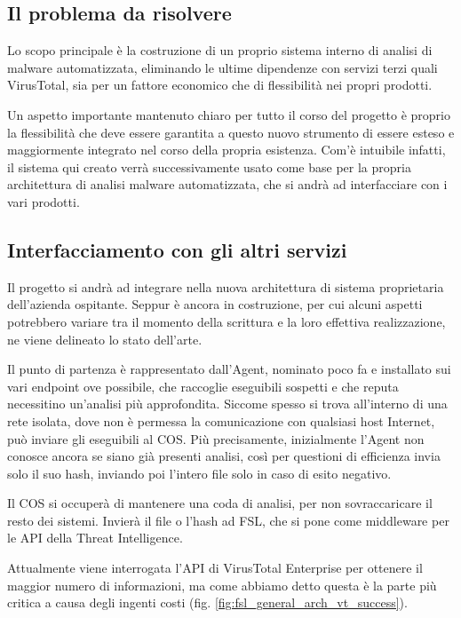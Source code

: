\subsection{Il problema da risolvere}
Lo scopo principale è la costruzione di un proprio sistema interno di analisi di malware automatizzata, eliminando le ultime dipendenze con servizi terzi quali VirusTotal, sia per un fattore economico che di flessibilità nei propri prodotti.

Un aspetto importante mantenuto chiaro per tutto il corso del progetto è proprio la flessibilità che deve essere garantita a questo nuovo strumento di essere esteso e maggiormente integrato nel corso della propria esistenza. Com'è intuibile infatti, il sistema qui creato verrà successivamente usato come base per la propria architettura di analisi malware automatizzata, che si andrà ad interfacciare con i vari prodotti.

\subsection{Interfacciamento con gli altri servizi}
\label{chap:intro_interface_with_other_services}

Il progetto si andrà ad integrare nella nuova architettura di sistema proprietaria dell'azienda ospitante.
Seppur è ancora in costruzione, per cui alcuni aspetti potrebbero variare tra il momento della scrittura e la loro effettiva realizzazione, ne viene delineato lo stato dell'arte.

Il punto di partenza è rappresentato dall'Agent, nominato poco fa e installato sui vari endpoint ove possibile, che raccoglie eseguibili sospetti e che reputa necessitino un'analisi più approfondita.
Siccome spesso si trova all'interno di una rete isolata, dove non è permessa la comunicazione con qualsiasi host Internet, può inviare gli eseguibili al COS. Più precisamente, inizialmente l'Agent non conosce ancora se siano già presenti analisi, così per questioni di efficienza invia solo il suo hash, inviando poi l'intero file solo in caso di esito negativo.

Il COS si occuperà di mantenere una coda di analisi, per non sovraccaricare il resto dei sistemi.
Invierà il file o l'hash ad FSL, che si pone come middleware per le API della Threat Intelligence.

Attualmente viene interrogata l'API di VirusTotal Enterprise per ottenere il maggior numero di informazioni, ma come abbiamo detto questa è la parte più critica a causa degli ingenti costi (fig. \ref{fig:fsl_general_arch_vt_success}).

